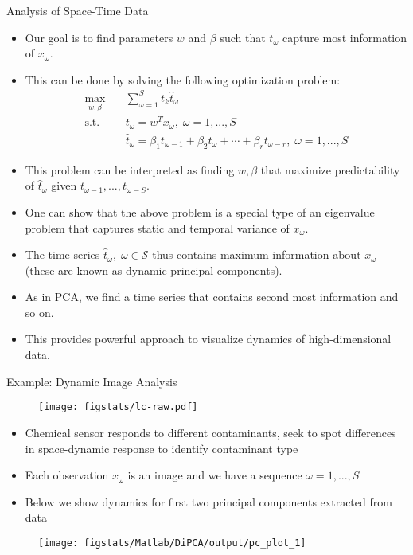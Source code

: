 \documentclass[9pt]{beamer}
\begin{document}
%
\begin{frame}{Analysis of Space-Time Data}

\begin{itemize}
\item Our goal is to find parameters $w$ and $\beta$ such that $t_\omega$ capture most information of $x_\omega$.
\item This can be done by solving the following optimization problem:
\begin{align*}
\max_{w,\beta}& \quad \sum_{\omega=1}^{S}t_k\hat{t}_\omega\\
\textrm{s.t.}& \quad t_\omega=w^Tx_\omega,\; \omega=1,...,S\\
& \quad \hat{t}_\omega=\beta_1t_{\omega-1}+\beta_2t_{\omega}+\cdots+\beta_rt_{\omega-r},\; \omega=1,...,S
\end{align*}
\item This problem can be interpreted as finding $w,\beta$ that maximize predictability of $\hat{t}_\omega$ given $t_{\omega-1},...,t_{\omega-S}$. 
\item One can show that the above problem is a special type of an eigenvalue problem that captures static and temporal variance of $x_\omega$. 
\item The time series $\hat{t}_\omega,\; \omega\in\mathcal{S}$ thus contains maximum information about $x_\omega$ (these are known as dynamic principal components).
\item As in PCA, we find a time series that contains second most information and so on.
\item This provides powerful approach to visualize dynamics of high-dimensional data. 
\end{itemize}

\end{frame}

\begin{frame}{Example: Dynamic Image Analysis}
\begin{figure}[!htb]
    \centering
  \texttt{[image: figstats/lc-raw.pdf]}
  \end{figure}
  \begin{itemize}
  \item Chemical sensor responds to different contaminants, seek to spot differences in space-dynamic response to identify contaminant type
  \item Each observation $x_\omega$ is an image and we have a sequence $\omega=1,...,S$
  \item Below we show dynamics for first two principal components extracted from data
  \end{itemize}
\begin{figure}[!htb]
    \centering
    \texttt{[image: figstats/Matlab/DiPCA/output/pc\_plot\_1]}
    \end{figure}
\end{frame}
\end{document}
